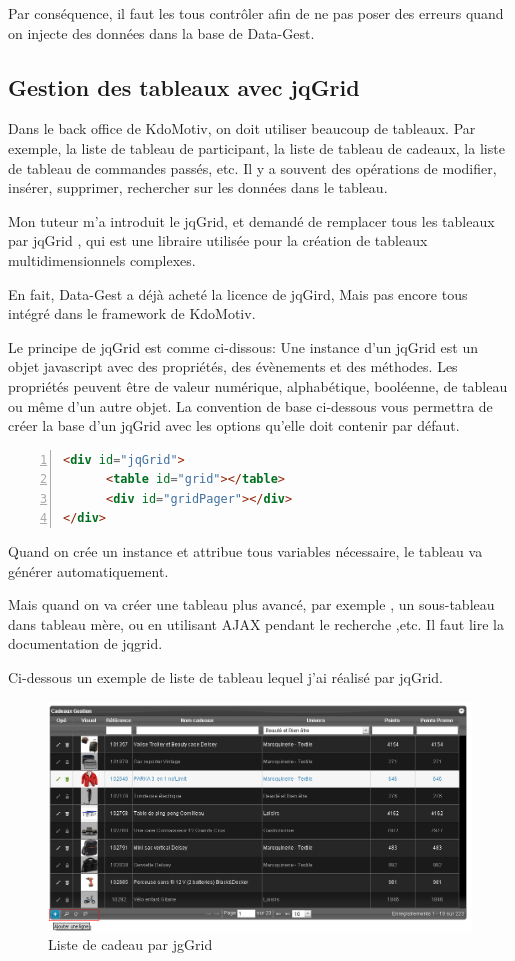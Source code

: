 Par conséquence, il faut les tous contrôler afin de ne pas poser des erreurs quand on injecte des données dans la base de Data-Gest.

\subsection{Gestion des tableaux avec jqGrid}
Dans le back office de KdoMotiv, on doit utiliser beaucoup de tableaux. Par exemple, la liste de tableau de participant, la liste de tableau de cadeaux, la liste de tableau de commandes passés, etc. Il y a souvent des opérations de modifier, insérer, supprimer, rechercher sur les données dans le tableau.

Mon tuteur  m'a introduit le jqGrid, et demandé de remplacer tous les tableaux par jqGrid , qui est une libraire utilisée pour la création de tableaux multidimensionnels complexes.

En fait, Data-Gest a déjà acheté la licence de jqGird,  Mais pas encore tous intégré dans le framework de KdoMotiv. 

Le principe de jqGrid est comme ci-dissous:
Une instance d’un jqGrid est un objet javascript avec des propriétés, des évènements et des méthodes. Les propriétés peuvent être de valeur numérique, alphabétique, booléenne, de  tableau ou même d’un autre objet. La convention de base ci-dessous vous permettra de créer la base d’un jqGrid avec les options qu’elle doit contenir par défaut.

\begin{lstlisting}[language= html, numbers=left, numberstyle=\tiny,  frame=shadowbox]
<div id="jqGrid">
      <table id="grid"></table>
      <div id="gridPager"></div>
</div>
\end{lstlisting}

Quand on crée un instance et attribue tous variables nécessaire, le tableau va générer automatiquement.

Mais quand on va créer une tableau plus avancé, par exemple , un sous-tableau dans tableau mère, ou en utilisant AJAX pendant le recherche ,etc. Il faut lire la documentation de jqgrid.

Ci-dessous un exemple de liste de tableau lequel j'ai réalisé par jqGrid.
\begin{figure}[hbtp]
\includegraphics[width=16cm]{body/images/cadeau-new.png}
\caption{Liste de cadeau par jgGrid}
\end{figure}

